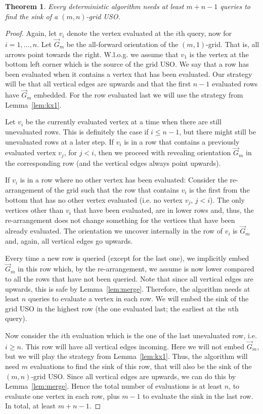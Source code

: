 \documentclass[a4paper,10pt]{article}
\newtheorem{theorem}{Theorem}
\newcommand{\og}{\overrightarrow{G}}
\begin{document}
\begin{theorem} \label{thm:lowerbound}
Every deterministic algorithm needs at least $m+n-1$ queries to find the sink of a $(m,n)$-grid USO. 
\end{theorem}
\begin{proof}
Again, let $v_i$ denote the vertex evaluated at the $i$th query, now for $i=1,\ldots, n$. Let $\og_m$ be the all-forward orientation of the $(m,1)$-grid. 
That is, all arrows point towards the right. 
W.l.o.g. we assume that $v_1$ is the vertex 
at the bottom left corner which is the source of the grid USO. 
We say that a row has been evaluated when it contains a vertex that has been evaluated. 
Our strategy will be that all vertical edges are upwards and that the first $n-1$ evaluated rows 
have $\og_m$ embedded. For the row evaluated last we will use the strategy from Lemma~\ref{lem:kx1}.

Let $v_i$ be the currently evaluated vertex at a time when there are still unevaluated rows. This is definitely the case if $i\leq n-1$, but there might still be
unevaluated rows at a later step. 
If $v_i$ is in a row that contains a previously evaluated vertex $v_j$, for $j < i$, then 
we proceed with revealing orientation $\og_m$ in the corresponding row (and the vertical edges always point upwards). 

If $v_i$ is in a row where no other vertex has been evaluated: Consider the re-arrangement of the grid 
such that the row that contains $v_i$ is the first from the bottom that has no other vertex evaluated (i.e. no vertex $v_j$, $j<i$). 
The only vertices other than $v_i$ that have been evaluated, are in lower rows and, thus, the re-arrangement does not change 
something for the vertices that have been already evaluated.
The orientation we uncover internally in the row of $v_i$ is $\og_m$ and, again, all vertical edges go upwards. 

Every time a new row is queried (except for the last one), 
we implicitly embed $\og_m$ in this row which, by the re-arrangement, we assume is now lower compared to all the rows
that have not been queried.  Note that since all vertical edges are upwards, this is safe by Lemma~\ref{lem:merge}.
Therefore, the algorithm needs at least $n$ queries to evaluate a vertex in each row. We will embed the sink of the grid USO in the highest row (the one 
evaluated last; the earliest at the $n$th query).

Now consider the $i$th evaluation which is the one of the last unevaluated row, i.e. $i \geq n$. This row will have all vertical edges incoming. 
Here we will not embed $\og_m$, but we will play the strategy from Lemma~\ref{lem:kx1}. Thus, the algorithm will need $m$ evaluations to find 
the sink of this row, that will also be the sink of the $(m,n)$-grid USO. Since all vertical edges are upwards, we can do this by Lemma~\ref{lem:merge}. 
Hence the total number of evaluations is at least $n$, to evaluate one vertex in each row, plus $m-1$ to evaluate the sink in the last row.
In total, at least $m+n-1$.
\end{proof}





\end{document}
